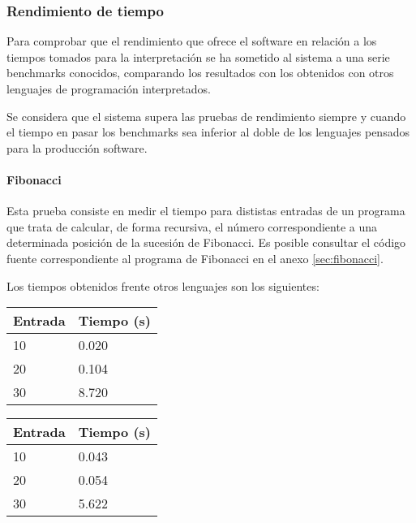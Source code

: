 \subsubsection{Rendimiento de tiempo}
Para comprobar que el rendimiento que ofrece el software en relación a los tiempos tomados para la interpretación 
se ha sometido al sistema a una serie benchmarks conocidos, comparando los resultados con los obtenidos con otros 
lenguajes de programación interpretados.

Se considera que el sistema supera las pruebas de rendimiento siempre y cuando el tiempo en pasar los benchmarks sea inferior al doble de
los lenguajes pensados para la producción software.

\paragraph{Fibonacci}
Esta prueba consiste en medir el tiempo para dististas entradas de un programa que trata de calcular, de forma recursiva, 
el número correspondiente a una determinada posición de la sucesión de Fibonacci. 
Es posible consultar el código fuente correspondiente al programa de Fibonacci en el anexo \ref{sec:fibonacci}.

Los tiempos obtenidos frente otros lenguajes son los siguientes: 
\begin{multicols}{2}
    \begin{center}
   \begin{tabular}{|l|l|} \hline 
   \bf{Entrada} & \bf{Tiempo (s)} \\ \hline 
   10 & 0.020 \\ \hline 
   20 &  0.104 \\ \hline
   30 & 8.720 \\ \hline 
   \end{tabular}
   \end{center}
\columnbreak
    \begin{center}
   \begin{tabular}{|l|l|} \hline 
   \bf{Entrada} & \bf{Tiempo (s)} \\ \hline 
   10 & 0.043 \\ \hline 
   20 & 0.054	 \\ \hline
   30 & 5.622 \\ \hline 
   \end{tabular}
   \end{center}
\end{multicols}

